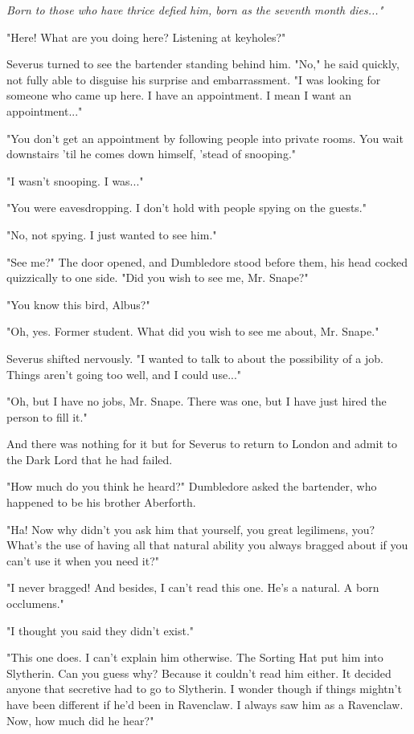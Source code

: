 \documentclass[a4paper,11pt]{article}
\begin{document}
\emph{Born to those who have thrice defied him, born as the seventh month dies..."}

"Here! What are you doing here? Listening at keyholes?"

Severus turned to see the bartender standing behind him. "No," he said quickly, not fully able to disguise his surprise and embarrassment. "I was looking for someone who came up here. I have an appointment. I mean I want an appointment..."

"You don't get an appointment by following people into private rooms. You wait downstairs 'til he comes down himself, 'stead of snooping."

"I wasn't snooping. I was..."

"You were eavesdropping. I don't hold with people spying on the guests."

"No, not spying. I just wanted to see him."

"See me?" The door opened, and Dumbledore stood before them, his head cocked quizzically to one side. "Did you wish to see me, Mr. Snape?"

"You know this bird, Albus?"

"Oh, yes. Former student. What did you wish to see me about, Mr. Snape."

Severus shifted nervously. "I wanted to talk to about the possibility of a job. Things aren't going too well, and I could use..."

"Oh, but I have no jobs, Mr. Snape. There was one, but I have just hired the person to fill it."

And there was nothing for it but for Severus to return to London and admit to the Dark Lord that he had failed.

"How much do you think he heard?" Dumbledore asked the bartender, who happened to be his brother Aberforth.

"Ha! Now why didn't you ask him that yourself, you great legilimens, you? What's the use of having all that natural ability you always bragged about if you can't use it when you need it?"

"I never bragged! And besides, I can't read this one. He's a natural. A born occlumens."

"I thought you said they didn't exist."

"This one does. I can't explain him otherwise. The Sorting Hat put him into Slytherin. Can you guess why? Because it couldn't read him either. It decided anyone that secretive had to go to Slytherin. I wonder though if things mightn't have been different if he'd been in Ravenclaw. I always saw him as a Ravenclaw. Now, how much did he hear?"
\end{document}
